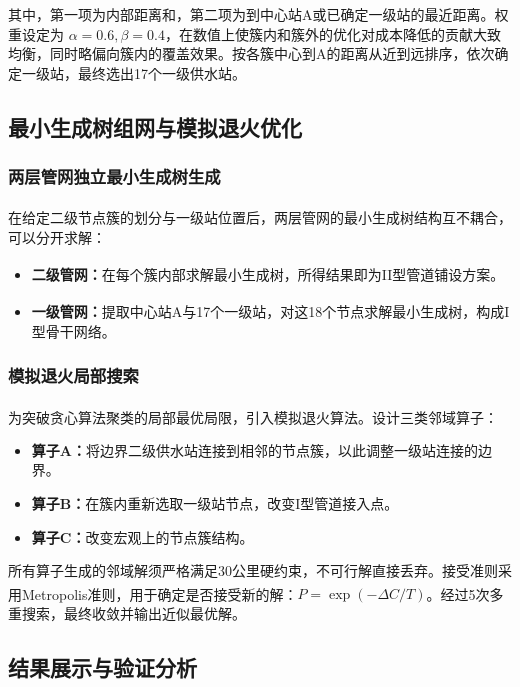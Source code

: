 \documentclass[12pt,a4paper]{ctexart}
\theoremstyle{definition}
\theoremstyle{plain}
\theoremstyle{remark}
\newcommand{\supercite}[1]{\textsuperscript{\cite{#1}}}
\begin{document}
其中，第一项为内部距离和，第二项为到中心站A或已确定一级站的最近距离。权重设定为 $\alpha=0.6, \beta=0.4$，在数值上使簇内和簇外的优化对成本降低的贡献大致均衡，同时略偏向簇内的覆盖效果。按各簇中心到A的距离从近到远排序，依次确定一级站，最终选出17个一级供水站。

\subsection{最小生成树组网与模拟退火优化}
\subsubsection{两层管网独立最小生成树生成}
在给定二级节点簇的划分与一级站位置后，两层管网的最小生成树\supercite{ref1,ref2}结构互不耦合，可以分开求解：
\begin{itemize}
    \item \textbf{二级管网：}在每个簇内部求解最小生成树\supercite{ref1,ref2}，所得结果即为II型管道铺设方案。
    \item \textbf{一级管网：}提取中心站A与17个一级站，对这18个节点求解最小生成树\supercite{ref2}，构成I型骨干网络。
\end{itemize}

\subsubsection{模拟退火局部搜索}
为突破贪心算法聚类的局部最优局限，引入模拟退火算法\supercite{ref3,ref5}。设计三类邻域算子：
\begin{itemize}
    \item \textbf{算子A：}将边界二级供水站连接到相邻的节点簇，以此调整一级站连接的边界。
    \item \textbf{算子B：}在簇内重新选取一级站节点，改变I型管道接入点。
    \item \textbf{算子C：}改变宏观上的节点簇结构。
\end{itemize}

所有算子生成的邻域解须严格满足30公里硬约束，不可行解直接丢弃。接受准则采用Metropolis准则\supercite{ref3}，用于确定是否接受新的解：$P = \exp(-\Delta C / T)$。经过5次多重搜索，最终收敛并输出近似最优解。

\subsection{结果展示与验证分析}
\end{document}

